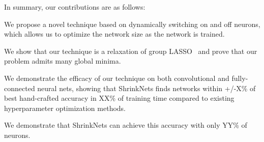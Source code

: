 
In summary, our contributions are as follows: 
\begin{compactenum}
\item We propose a novel technique based on dynamically switching on and off neurons, 
which allows us to optimize the network size as the network is trained. 
\item We show that our technique is a relaxation of group LASSO~\cite{Yuan2006} and prove that our problem admits many global minima.
\item {}
\item We demonstrate the efficacy of our technique on both convolutional and fully-connected neural nets,
showing that 
ShrinkNets finds networks within +/-X\% of best hand-crafted accuracy in XX\% of
training time compared to existing hyperparameter optimization methods. 
\item We demonstrate that ShrinkNets can achieve this accuracy with only YY\% 
of neurons. 
\item {}
\item {}
\item {}
\end{compactenum}
